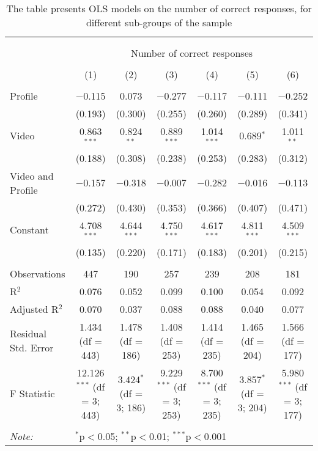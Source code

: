 
\begin{table}[H] \centering 
  \caption{The table presents OLS models on the number of correct responses, for different sub-groups of the sample} 
  \label{tbl:Main_results_CR_no_control} 
\begin{tabular}{@{\extracolsep{5pt}}lcccccc} 
\\[-1.8ex]\hline 
\hline \\[-1.8ex] 
\\[-1.8ex] & \multicolumn{6}{c}{Number of correct responses} \\ 
\\[-1.8ex] & (1) & (2) & (3) & (4) & (5) & (6)\\ 
\hline \\[-1.8ex] 
 Profile & $-$0.115 & 0.073 & $-$0.277 & $-$0.117 & $-$0.111 & $-$0.252 \\ 
  & (0.193) & (0.300) & (0.255) & (0.260) & (0.289) & (0.341) \\ 
  Video & 0.863$^{***}$ & 0.824$^{**}$ & 0.889$^{***}$ & 1.014$^{***}$ & 0.689$^{*}$ & 1.011$^{**}$ \\ 
  & (0.188) & (0.308) & (0.238) & (0.253) & (0.283) & (0.312) \\ 
  Video and Profile & $-$0.157 & $-$0.318 & $-$0.007 & $-$0.282 & $-$0.016 & $-$0.113 \\ 
  & (0.272) & (0.430) & (0.353) & (0.366) & (0.407) & (0.471) \\ 
  Constant & 4.708$^{***}$ & 4.644$^{***}$ & 4.750$^{***}$ & 4.617$^{***}$ & 4.811$^{***}$ & 4.509$^{***}$ \\ 
  & (0.135) & (0.220) & (0.171) & (0.183) & (0.201) & (0.215) \\ 
 \hline \\[-1.8ex] 
Observations & 447 & 190 & 257 & 239 & 208 & 181 \\ 
R$^{2}$ & 0.076 & 0.052 & 0.099 & 0.100 & 0.054 & 0.092 \\ 
Adjusted R$^{2}$ & 0.070 & 0.037 & 0.088 & 0.088 & 0.040 & 0.077 \\ 
Residual Std. Error & 1.434 (df = 443) & 1.478 (df = 186) & 1.408 (df = 253) & 1.414 (df = 235) & 1.465 (df = 204) & 1.566 (df = 177) \\ 
F Statistic & 12.126$^{***}$ (df = 3; 443) & 3.424$^{*}$ (df = 3; 186) & 9.229$^{***}$ (df = 3; 253) & 8.700$^{***}$ (df = 3; 235) & 3.857$^{*}$ (df = 3; 204) & 5.980$^{***}$ (df = 3; 177) \\ 
\hline 
\hline \\[-1.8ex] 
\textit{Note:}  & \multicolumn{6}{l}{$^{*}$p$<$0.05; $^{**}$p$<$0.01; $^{***}$p$<$0.001} \\ 
\end{tabular} 
\end{table} 
